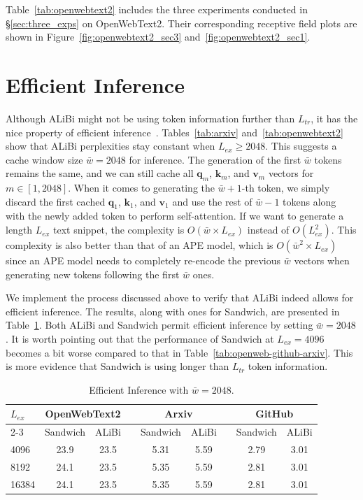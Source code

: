 \documentclass[11pt]{article}
\theoremstyle{plain}
\begin{document}
Table~\ref{tab:openwebtext2} includes the three experiments conducted in \S\ref{sec:three_exps} on OpenWebText2. Their corresponding receptive field plots are shown in Figure~\ref{fig:openwebtext2_sec3} and~\ref{fig:openwebtext2_sec1}.
\label{sec:appendix}

\section{Efficient Inference}
\label{sec:efficient_inference}
Although ALiBi might not be using token information further than $L_{tr}$, it has the nice property of efficient inference~\cite{usecase}. 
Tables~\ref{tab:arxiv} and~\ref{tab:openwebtext2} show that ALiBi perplexities stay constant when $L_{ex}\geq 2048$. This suggests a cache window size $\bar w=2048$ for inference. 
The generation of the first $\bar w$ tokens remains the same, and we can still cache all  $\bm q_m$, $\bm k_m$, and $\bm v_m$ vectors for $m\in[1,2048]$. 
When it comes to generating the $\bar w + 1$-th token, we simply discard the first cached $\bm q_1$, $\bm k_1$, and $\bm v_1$ and use the rest of $\bar w - 1$ tokens along with the newly added token to perform self-attention.
If we want to generate a length $L_{ex}$ text snippet, the complexity is $O(\bar w\times L_{ex})$ instead of $O(L_{ex}^2)$. 
This complexity is also better than that of an APE model, which is $O(\bar w^2\times L_{ex})$ since an APE model needs to completely re-encode the previous $\bar w$ vectors when generating  new tokens following the first $\bar w$ ones.

We implement the process discussed above to verify that ALiBi indeed allows for efficient inference.  The results, along with ones for Sandwich, are presented in Table~\ref{tab:efficient_inference}. 
Both ALiBi and Sandwich permit efficient inference by setting $\bar w=2048$. It is worth pointing out that the performance of Sandwich at $L_{ex}=4096$ becomes a bit worse compared to that in Table~\ref{tab:openweb-github-arxiv}. This is more evidence that Sandwich is using longer than $L_{tr}$ token information.

\begin{table}[!htbp]
    \setlength{\tabcolsep}{2pt}
    {
    \begin{tabular}{@{}lcccccccc}
    \hline\hline
    \multirow{2}{*}{$L_{ex}$} & \multicolumn{2}{c}{OpenWebText2} & & \multicolumn{2}{c}{Arxiv} & & \multicolumn{2}{c}{GitHub}\\
     \cline{2-3} \cline{5-6} \cline{8-9} &
     Sandwich & ALiBi & & Sandwich & ALiBi & & Sandwich & ALiBi\\
    \hline
    4096 & 23.9 & 23.5 & & 5.31 & 5.59 & & 2.79 & 3.01\\
    8192 & 24.1 & 23.5 & & 5.35 & 5.59 & & 2.81 & 3.01\\
    16384 & 24.1 & 23.5 & & 5.35 & 5.59 & & 2.81 & 3.01\\
    \hline\hline
    \end{tabular}
    }
    \caption{Efficient Inference with $\bar w=2048$.}
    \label{tab:efficient_inference}
\end{table}
\end{document}
